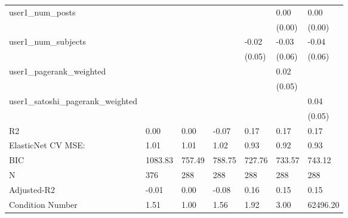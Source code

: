 \begin{table}
\begin{center}
\begin{tabular}{lllllll}
user1_num_posts                                &          &         &         &         & 0.00     & 0.00       \\
                                               &          &         &         &         & (0.00)   & (0.00)     \\
user1_num_subjects                             &          &         &         & -0.02   & -0.03    & -0.04      \\
                                               &          &         &         & (0.05)  & (0.06)   & (0.06)     \\
user1_pagerank_weighted                        &          &         &         &         & 0.02     &            \\
                                               &          &         &         &         & (0.05)   &            \\
user1_satoshi_pagerank_weighted                &          &         &         &         &          & 0.04       \\
                                               &          &         &         &         &          & (0.05)     \\
R2                                             & 0.00     & 0.00    & -0.07   & 0.17    & 0.17     & 0.17       \\
ElasticNet CV MSE:                             & 1.01     & 1.01    & 1.02    & 0.93    & 0.92     & 0.93       \\
BIC                                            & 1083.83  & 757.49  & 788.75  & 727.76  & 733.57   & 743.12     \\
N                                              & 376      & 288     & 288     & 288     & 288      & 288        \\
Adjusted-R2                                    & -0.01    & 0.00    & -0.08   & 0.16    & 0.15     & 0.15       \\
Condition Number                               & 1.51     & 1.00    & 1.56    & 1.92    & 3.00     & 62496.20   \\
\hline
\end{tabular}
\end{center}
\end{table}